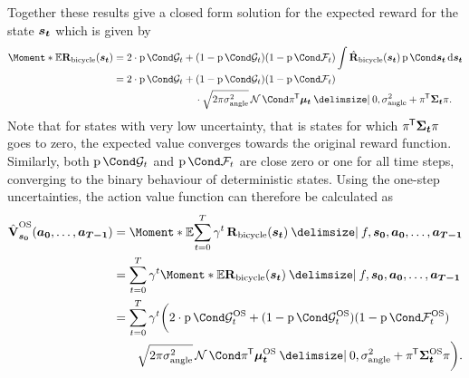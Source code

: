 Together these results give a closed form solution for the expected reward for the state $\bm{s_t}$ which is given by
\begin{align}
    \begin{split}
        \Moment*{\E}{\RwdBicycle(\rv{s_t})} &= 2 \cdot \Prob{\PGoal_t} + (1 - \Prob{\PGoal_t})(1 - \Prob{\PFallen_t}) \int \RwdBicycleHat(\rv{s_t}) \Prob{\rv{s_t}} \diff \rv{s_t} \\
        &= 2 \cdot \Prob{\PGoal_t} + (1 - \Prob{\PGoal_t})(1 - \Prob{\PFallen_t}) \\
        &\qquad\qquad\qquad\qquad\cdot\sqrt{2\pi\sigma_{\text{angle}}^2} \Gaussian{\pi\tran \mat{\mu_t} \given 0, \sigma_{\text{angle}}^2 + \pi\tran \mat{\Sigma_t}\pi}.
    \end{split}
\end{align}
Note that for states with very low uncertainty, that is states for which $\pi\tran \mat{\Sigma_t} \pi$ goes to zero, the expected value converges towards the original reward function.
Similarly, both $\Prob{\PGoal_t}$ and $\Prob{\PFallen_t}$ are close zero or one for all time steps, converging to the binary behaviour of deterministic states.
Using the one-step uncertainties, the action value function can therefore be calculated as
\begin{align}
    \label{eq:os_action_value_function}
    \begin{split}
        \os{\AVlu}_{\mat{s_0}}(\mat{a_0}, \dots, \mat{a_{T-1}}) &= \Moment*{\E}{\sum_{t=0}^T \gamma^t \RwdBicycle(\mat{s_t}) \given f, \mat{s_0}, \mat{a_0}, \dots, \mat{a_{T-1}}} \\
        &= \sum_{t=0}^T \gamma^t \Moment*{\E}{\RwdBicycle(\mat{s_t}) \given f, \mat{s_0}, \mat{a_0}, \dots, \mat{a_{T-1}}} \\
        &= \sum_{t=0}^T \gamma^t \bigg( 2 \cdot \Prob{\os{\PGoal}_t} + (1 - \Prob{\os{\PGoal}_t})(1 - \Prob{\os{\PFallen}_t}) \\
        &\qquad \sqrt{2\pi\sigma_{\text{angle}}^2} \Gaussian{\pi\tran \os{\mat{\mu_t}} \given 0, \sigma_{\text{angle}}^2 + \pi\tran \os{\mat{\Sigma_t}}\pi} \bigg).
    \end{split}
\end{align}

